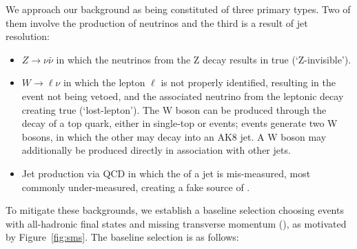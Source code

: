 We approach our background as being constituted of three primary types. Two of them involve the production of neutrinos and the third is a result of jet resolution:

\begin{itemize}
\item $Z\rightarrow\nu\bar{\nu}$ in which the neutrinos from the Z decay results in true \ptmiss (`Z-invisible').
\item $W\rightarrow\ell\nu$ in which the lepton $\ell$ is not properly identified, resulting in the event not being vetoed, and the associated neutrino from the leptonic decay creating true \ptmiss (`lost-lepton'). The W boson can be produced through the decay of a top quark, either in single-top or \ttbar events; \ttbar events generate two W bosons, in which the other may decay into an AK8 jet. A W boson may additionally be produced directly in association with other jets.
\item Jet production via QCD in which the \pt of a jet is mis-measured, most commonly under-measured, creating a fake source of \ptmiss.
\end{itemize}

To mitigate these backgrounds, we establish a baseline selection choosing events with all-hadronic final states and missing transverse momentum (\ptmiss), as motivated by Figure~\ref{fig:sms}. The baseline selection is as follows:

